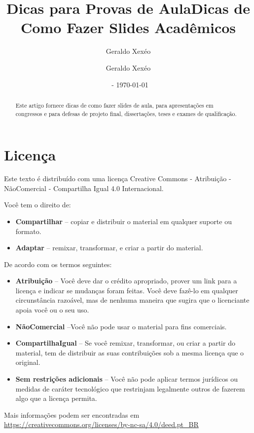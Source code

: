 \documentclass[12pt,a4paper]{article}
\title{Dicas para Provas de Aula}
\author{Geraldo Xexéo}
\affil{\url{xexeo@ufrj.br} \\
    \url{http://xexeo.net}}
\date{\ccbyncsa\  - \today}
\author{Geraldo Xexéo}
\title{Dicas de Como Fazer Slides Acadêmicos}
\begin{document}
\maketitle

\begin{abstract}
    Este artigo fornece dicas de como fazer slides de aula, para apresentações em congressos e para defesas de projeto final, dissertações, teses e exames de qualificação.
\end{abstract}

\tableofcontents









\section*{Licença}


Este texto é distribuído com uma licença Creative Commons - Atribuição - NãoComercial - Compartilha Igual 4.0 Internacional.




\begin{center}
   \ccbyncsa
\end{center}

Você tem o direito de:
\begin{itemize}
    \item \textbf{Compartilhar} -- copiar e distribuir o material em qualquer suporte ou formato.
    \item \textbf{Adaptar} -- remixar, transformar, e criar a partir do material.
\end{itemize}

De acordo com os termos seguintes:
\begin{itemize}
    \item \textbf{Atribuição} -- Você deve dar o crédito apropriado, prover um link para a licença e indicar se mudanças foram feitas. Você deve fazê-lo em qualquer circunstância razoável, mas de nenhuma maneira que sugira que o licenciante apoia você ou o seu uso.
    \item \textbf{NãoComercial} --Você não pode usar o material para fins comerciais.
    \item \textbf{CompartilhaIgual} -- Se você remixar, transformar, ou criar a partir do material, tem de distribuir as suas contribuições sob a mesma licença que o original.
    \item \textbf{Sem restrições adicionais} -- Você não pode aplicar termos jurídicos ou medidas de caráter tecnológico que restrinjam legalmente outros de fazerem algo que a licença permita.
\end{itemize}

Mais informações podem ser encontradas em \url{https://creativecommons.org/licenses/by-nc-sa/4.0/deed.pt_BR}
\end{document}
